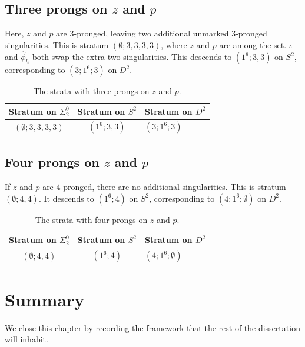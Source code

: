 \subsection{Three prongs on $z$ and $p$}
Here, $z$ and $p$ are 3-pronged, leaving two additional unmarked 3-pronged singularities. This is stratum $(\emptyset;3,3,3,3)$, where $z$ and $p$ are among the set. $\iota$ and $\hat{\phi}_h$ both swap the extra two singularities. This descends to $(1^6; 3,3)$ on $S^2$, corresponding to $(3;1^6;3)$ on $D^2$.

\begin{table}[ht]
    \centering
    \begin{tabular}{c c l}
        \toprule
        Stratum on $\Sigma_2^0$ & Stratum on $S^2$ & Stratum on $D^2$ \\
        \midrule
        $(\emptyset;3,3,3,3)$ & $(1^6; 3,3)$ & $(3;1^6;3)$ \\
        \bottomrule
    \end{tabular}
    \caption{The strata with three prongs on $z$ and $p$.}
    \label{tab:strata_3_prongs}
\end{table}

\subsection{Four prongs on $z$ and $p$}
If $z$ and $p$ are 4-pronged, there are no additional singularities. This is stratum $(\emptyset;4,4)$. It descends to $(1^6;4)$ on $S^2$, corresponding to $(4;1^6;\emptyset)$ on $D^2$.

\begin{table}[ht]
    \centering
    \begin{tabular}{c c l}
        \toprule
        Stratum on $\Sigma_2^0$ & Stratum on $S^2$ & Stratum on $D^2$ \\
        \midrule
        $(\emptyset;4,4)$ & $(1^6;4)$ &  $(4;1^6;\emptyset)$ \\
        \bottomrule
    \end{tabular}
    \caption{The strata with four prongs on $z$ and $p$.}
    \label{tab:strata_4_prongs}
\end{table}

\section{Summary}\label{sec:preliminaries_summary}

We close this chapter by recording the framework that the rest of the dissertation will inhabit.

